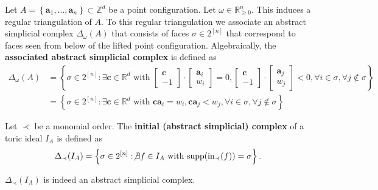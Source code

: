 \documentclass[a4paper, 11pt]{article}
\begin{document}
\begin{defi}
  Let \( A = \left\{ \mathbf a_1, \dots,\mathbf  a_n \right\} \subset \mathbb Z^d \) be a point configuration. Let \( \omega \in \mathbb R^n_{\geq 0} \). This induces a regular triangulation of \( A \). To this regular triangulation we associate an abstract simplicial complex \( \Delta_\omega(A) \) that consists of faces \( \sigma \in 2^{[n]} \) that correspond to faces seen from below of the lifted point configuration. Algebraically, the \textbf{associated abstract simplicial complex} is defined as 
  \begin{align*}
    \Delta_\omega(A) &=  \left\{ \sigma \in 2^{[n]} : \exists \mathbf c \in \mathbb R^d \text{ with } \begin{bmatrix}\mathbf c\\-1\end{bmatrix}\cdot \begin{bmatrix}\mathbf a_i\\w_i\end{bmatrix}  = 0, \begin{bmatrix}\mathbf c\\-1\end{bmatrix}\cdot \begin{bmatrix}\mathbf a_j\\w_j\end{bmatrix}  < 0,  \forall i \in \sigma, \forall j \notin \sigma \right\} \\
    &= \left\{ \sigma \in 2^{[n]} : \exists \mathbf  c \in \mathbb R^d \text{ with } \mathbf c \mathbf a_i = w_i, \mathbf c \mathbf a_j < w_j, \forall i \in \sigma, \forall j \notin \sigma \right\}
  \end{align*}
\end{defi}

\begin{defi}
  Let \( \prec \) be a monomial order. The \textbf{initial (abstract simplicial) complex} of a toric ideal \( I_A \) is defined as 
  \begin{align*}
    \Delta_\prec(I_A) = \left\{ 
      \sigma \in 2^{[n]} : \not \exists f \in I_A \text{ with } \mathrm{supp}(\mathrm{in}_\prec(f)) = \sigma
     \right\}.
  \end{align*}
\end{defi}

\begin{prop}
  \( \Delta_\prec(I_A) \) is indeed an abstract simplicial complex.
\end{prop}
\end{document}

